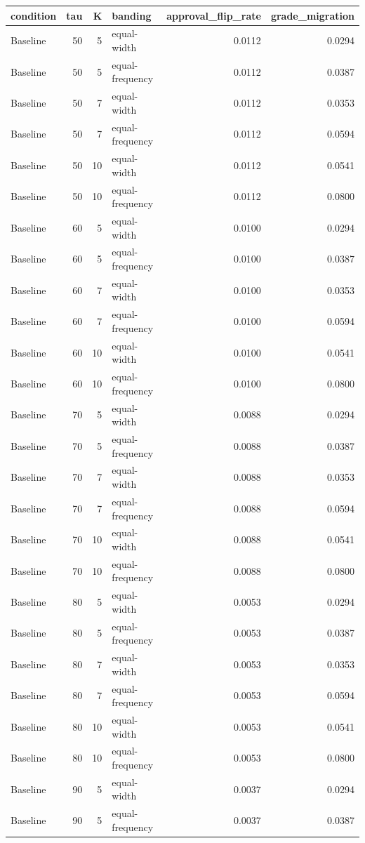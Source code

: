 \begin{tabular}{lrrlrr}
\toprule
condition & tau & K & banding & approval_flip_rate & grade_migration \\
\midrule
Baseline & 50 & 5 & equal-width & 0.0112 & 0.0294 \\
Baseline & 50 & 5 & equal-frequency & 0.0112 & 0.0387 \\
Baseline & 50 & 7 & equal-width & 0.0112 & 0.0353 \\
Baseline & 50 & 7 & equal-frequency & 0.0112 & 0.0594 \\
Baseline & 50 & 10 & equal-width & 0.0112 & 0.0541 \\
Baseline & 50 & 10 & equal-frequency & 0.0112 & 0.0800 \\
Baseline & 60 & 5 & equal-width & 0.0100 & 0.0294 \\
Baseline & 60 & 5 & equal-frequency & 0.0100 & 0.0387 \\
Baseline & 60 & 7 & equal-width & 0.0100 & 0.0353 \\
Baseline & 60 & 7 & equal-frequency & 0.0100 & 0.0594 \\
Baseline & 60 & 10 & equal-width & 0.0100 & 0.0541 \\
Baseline & 60 & 10 & equal-frequency & 0.0100 & 0.0800 \\
Baseline & 70 & 5 & equal-width & 0.0088 & 0.0294 \\
Baseline & 70 & 5 & equal-frequency & 0.0088 & 0.0387 \\
Baseline & 70 & 7 & equal-width & 0.0088 & 0.0353 \\
Baseline & 70 & 7 & equal-frequency & 0.0088 & 0.0594 \\
Baseline & 70 & 10 & equal-width & 0.0088 & 0.0541 \\
Baseline & 70 & 10 & equal-frequency & 0.0088 & 0.0800 \\
Baseline & 80 & 5 & equal-width & 0.0053 & 0.0294 \\
Baseline & 80 & 5 & equal-frequency & 0.0053 & 0.0387 \\
Baseline & 80 & 7 & equal-width & 0.0053 & 0.0353 \\
Baseline & 80 & 7 & equal-frequency & 0.0053 & 0.0594 \\
Baseline & 80 & 10 & equal-width & 0.0053 & 0.0541 \\
Baseline & 80 & 10 & equal-frequency & 0.0053 & 0.0800 \\
Baseline & 90 & 5 & equal-width & 0.0037 & 0.0294 \\
Baseline & 90 & 5 & equal-frequency & 0.0037 & 0.0387 \\

\end{tabular}
